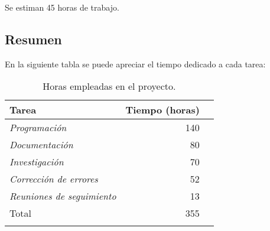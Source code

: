Se estiman 45 horas de trabajo.

\subsection{Resumen}
En la siguiente tabla se puede apreciar el tiempo dedicado a cada tarea:


\begin{longtable}[]{@{}lrr@{}}
\toprule
\begin{minipage}[b]{0.37\columnwidth}\raggedright\strut
Tarea\strut
\end{minipage} & \begin{minipage}[b]{0.37\columnwidth}\raggedleft\strut
Tiempo (horas)\strut
\end{minipage}\tabularnewline
\midrule
\endhead

\begin{minipage}[t]{0.37\columnwidth}\raggedright\strut
\emph{Programación}\strut
\end{minipage} & \begin{minipage}[t]{0.37\columnwidth}\raggedleft\strut
140\strut
\end{minipage}\tabularnewline
\begin{minipage}[t]{0.37\columnwidth}\raggedright\strut
\emph{Documentación}\strut
\end{minipage} & \begin{minipage}[t]{0.37\columnwidth}\raggedleft\strut
80\strut
\end{minipage}\tabularnewline
\begin{minipage}[t]{0.37\columnwidth}\raggedright\strut
\emph{Investigación}\strut
\end{minipage}& \begin{minipage}[t]{0.37\columnwidth}\raggedleft\strut
70\strut
\end{minipage}\tabularnewline
\begin{minipage}[t]{0.37\columnwidth}\raggedright\strut
\emph{Corrección de errores}\strut
\end{minipage} & \begin{minipage}[t]{0.37\columnwidth}\raggedleft\strut
52\strut
\end{minipage}\tabularnewline
\begin{minipage}[t]{0.37\columnwidth}\raggedright\strut
\emph{Reuniones de seguimiento}\strut
\end{minipage} & \begin{minipage}[t]{0.37\columnwidth}\raggedleft\strut
13\strut
\end{minipage}\tabularnewline
\midrule
\begin{minipage}[t]{0.37\columnwidth}\raggedright\strut
Total\strut
\end{minipage} & \begin{minipage}[t]{0.37\columnwidth}\raggedleft\strut
355\strut
\end{minipage}\tabularnewline
\bottomrule
\caption{Horas empleadas en el proyecto.}
\end{longtable}

